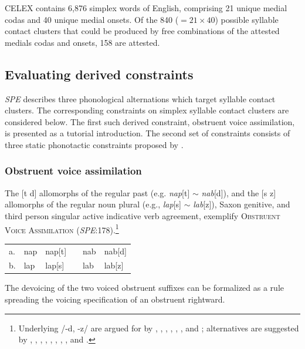 CELEX contains 6,876 simplex words of English, comprising 21 unique medial codas and 40 unique medial onsets. Of the 840 ($= 21 \times 40$) possible syllable contact clusters that could be produced by free combinations of the attested medials codas and onsets, 158 are attested.

\subsection{Evaluating derived constraints}

\emph{SPE} describes three phonological alternations which target syllable contact clusters. The corresponding constraints on simplex syllable contact clusters are considered below. The first such derived constraint, obstruent voice assimilation, is presented as a tutorial introduction. The second set of constraints consists of three static phonotactic constraints proposed by \citet{Pierrehumbert1994}.

\subsubsection{Obstruent voice assimilation} \label{ova}

The [t \alt{} d] allomorphs of the regular past (e.g. \emph{nap}[t] $\sim$ \emph{nab}[d]), and the [s \alt{} z] allomorphs of the regular noun plural (e.g., \emph{lap}[s] $\sim$ \emph{lab}[z]), Saxon genitive, and third person singular active indicative verb agreement, exemplify \textsc{Obstruent Voice Assimilation} (\emph{SPE}:178).\footnote{Underlying /-d, -z/ are argued for by \citet[282]{Hockett1958}, \citet[210]{SPE}, \citet{Basboll1972}, \citet{Shibatani1972}, \citet{Anderson1973a}, \citet[102]{Pinker1988}, and \citet[284f.]{Bakovic2005b}; alternatives are suggested by \citet[210f.]{LANGUAGE}, \citet[426]{Nida1948}, \citet{Luelsdorff1969}, \citet{Lightner1970}, \citet{Hoard1971}, \citet{Miner1975}, \citet{Zwicky1975}, \citet{Kiparsky1985}, and \citet[135]{Borowsky1986}.}

\begin{example}
\begin{tabular}{l l l l l l}
a. & {nap} & {nap}[t] & & {nab} & {nab}[d] \\
b. & {lap} & {lap}[s] & & {lab} & {lab}[z] \\
\end{tabular}
\end{example}

\noindent The devoicing of the two voiced obstruent suffixes can be formalized as a 
rule spreading the voicing specification of an obstruent rightward.

